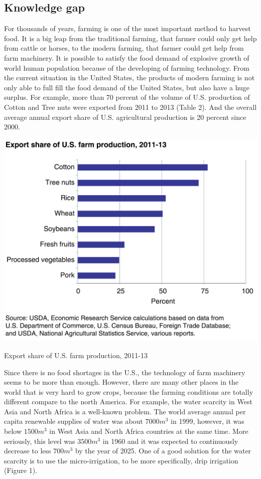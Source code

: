 \documentclass[12pt]{article}
\begin{document}
\begin{flushleft}
\subsection{Knowledge gap}
For thousands of years, farming is one of the most important method to harvest food. It is a big leap from the traditional farming, that farmer could only get help from cattle or horses, to the modern farming, that farmer could get help from farm machinery. It is possible to satisfy the food demand of explosive growth of world human population because of the developing of farming technology. From the current situation in the United States, the products of modern farming is not only able to full fill the food demand of the United States, but also have a huge surplus. For example, more than 70 percent of the volume of U.S. production of Cotton and Tree nuts were exported from 2011 to 2013 (Table 2). And the overall average annual export share of U.S. agricultural production is 20 percent since 2000. \cite{Exports}
\begin{table}[ht!]
	\begin{center}
		\includegraphics[scale = 0.4]{cropexport.png}
		\caption{Export share of U.S. farm production, 2011-13}
	\end{center}
\end{table}
Since there is no food shortages in the U.S., the technology of farm machinery seems to be more than enough. However, there are many other places in the world that is very hard to grow crops, because the farming conditions are totally different compare to the north America. For example, the water scarcity in West Asia and North Africa is a well-known problem. The world average annual per capita renewable supplies of water was about $7000 m^{3}$ in 1999, however, it was below $1500 m^{3}$ in West Asia and North Africa countries at the same time. More seriously, this level was $3500 m^{3}$ in 1960 and it was expected to continuously decrease to less $700 m^{3}$ by the year of 2025. \cite{margat1999water} One of a good solution for the water scarcity is to use the micro-irrigation, to be more specifically, drip irrigation (Figure 1). 

\end{flushleft}
\end{document}
